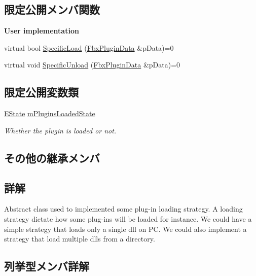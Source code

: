 \subsection*{限定公開メンバ関数}
\begin{Indent}\textbf{ User implementation}\par
\begin{DoxyCompactItemize}
\item 
virtual bool \hyperlink{class_fbx_loading_strategy_a5e1fb1dd165eeb5d4670aab41bed1659}{Specific\+Load} (\hyperlink{struct_fbx_plugin_data}{Fbx\+Plugin\+Data} \&p\+Data)=0
\item 
virtual void \hyperlink{class_fbx_loading_strategy_a22f41510c2741f68ffb96f7c3da79a85}{Specific\+Unload} (\hyperlink{struct_fbx_plugin_data}{Fbx\+Plugin\+Data} \&p\+Data)=0
\end{DoxyCompactItemize}
\end{Indent}
\subsection*{限定公開変数類}
\begin{DoxyCompactItemize}
\item 
\hyperlink{class_fbx_loading_strategy_a2f61523e78f4bb06d46ccf3351d2bcdb}{E\+State} \hyperlink{class_fbx_loading_strategy_a7ae53371abecd1686cd765d19697e1c8}{m\+Plugins\+Loaded\+State}
\begin{DoxyCompactList}\small\item\em Whether the plugin is loaded or not. \end{DoxyCompactList}\end{DoxyCompactItemize}
\subsection*{その他の継承メンバ}


\subsection{詳解}
Abstract class used to implemented some plug-\/in loading strategy. A loading strategy dictate how some plug-\/ins will be loaded for instance. We could have a simple strategy that loads only a single dll on PC. We could also implement a strategy that load multiple dlls from a directory. 

\subsection{列挙型メンバ詳解}
\mbox{\label{class_fbx_loading_strategy_a2f61523e78f4bb06d46ccf3351d2bcdb}} 
